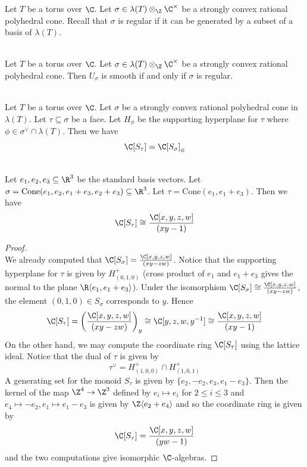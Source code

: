 \documentclass[a4paper]{article}
\begin{document}
Let $T$ be a torus over $\C$. Let $\sigma\in\lambda(T)\otimes_\Z\C^\times$ be a strongly convex rational polyhedral cone. Recall that $\sigma$ is regular if it can be generated by a subset of a basis of $\lambda(T)$. 

\begin{prp}{}{}\\
Let $T$ be a torus over $\C$. Let $\sigma\in\lambda(T)\otimes_\Z\C^\times$ be a strongly convex rational polyhedral cone. Then $U_\sigma$ is smooth if and only if $\sigma$ is regular. 
\end{prp}

\begin{prp}{}{}\\
Let $T$ be a torus over $\C$. Let $\sigma$ be a strongly convex rational polyhedral cone in $\lambda(T)$. Let $\tau\subseteq\sigma$ be a face. Let $H_\phi$ be the supporting hyperplane for $\tau$ where $\phi\in\sigma^\vee\cap\lambda(T)$. Then we have $$\C[S_\tau]=\C[S_\sigma]_\phi$$
\end{prp}

\begin{eg}{}{}\\
Let $e_1,e_2,e_3\subseteq\R^3$ be the standard basis vectors. Let $\sigma=\text{Cone}(e_1,e_2,e_1+e_3,e_2+e_3)\subseteq\R^3$. Let $\tau=\text{Cone}(e_1,e_1+e_3)$. Then we have $$\C[S_\tau]\cong\frac{\C[x,y,z,w]}{(xy-1)}$$
\begin{proof}\\
We already computed that $\C[S_\sigma]=\frac{\C[x,y,z,w]}{(xy-zw)}$. Notice that the supporting hyperplane for $\tau$ is given by $H_{(0,1,0)}^+$ (cross product of $e_1$ and $e_1+e_3$ gives the normal to the plane $\R\langle e_1,e_1+e_3\rangle$). Under the isomorphism $\C[S_\sigma]\cong\frac{\C[x,y,z,w]}{(xy-zw)}$, the element $(0,1,0)\in S_\sigma$ corresponds to $y$. Hence $$\C[S_\tau]=\left(\frac{\C[x,y,z,w]}{(xy-zw)}\right)_y\cong\C[y,z,w,y^{-1}]\cong\frac{\C[x,y,z,w]}{(xy-1)}$$ On the other hand, we may compute the coordinate ring $\C[S_\tau]$ using the lattice ideal. Notice that the dual of $\tau$ is given by $$\tau^\vee= H_{(1,0,0)}^+\cap H_{(1,0,1)}^+$$ A generating set for the monoid $S_\tau$ is given by $\{e_2,-e_2,e_3,e_1-e_3\}$. Then the kernel of the map $\Z^4\to\Z^3$ defined by $e_i\mapsto e_i$ for $2\leq i\leq 3$ and $e_4\mapsto-e_2,e_1\mapsto e_1-e_3$ is given by $\Z\langle e_2+e_4\rangle$ and so the coordinate ring is given by $$\C[S_\tau]=\frac{\C[x,y,z,w]}{(yw-1)}$$ and the two computations give isomorphic $\C$-algebras. 
\end{proof}
\end{eg}
\end{document}
